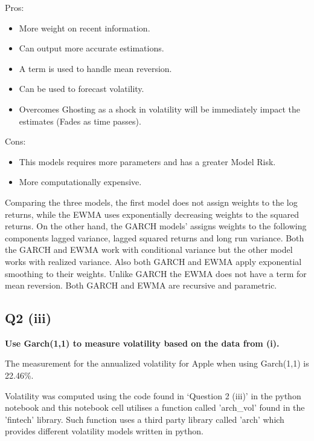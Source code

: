 Pros:
\begin{itemize}
  \item More weight on recent information.
  \item Can output more accurate estimations. 
  \item A term is used to handle mean reversion. 
  \item Can be used to forecast volatility. 
  \item Overcomes Ghosting as a shock in volatility will be immediately impact the estimates (Fades as time passes).
\end{itemize}

Cons:
\begin{itemize}
    \item This models requires more parameters and has a greater Model Risk.
    \item More computationally expensive. 
\end{itemize}

\noindent
Comparing the three models, the first model does not assign weights to the log returns, while the EWMA uses exponentially decreasing weights to the squared returns. On the other hand, the GARCH models’ assigns weights to the following components lagged variance, lagged squared returns and long run variance. Both the GARCH and EWMA work with conditional variance but the other model works with realized variance. Also both GARCH and EWMA apply exponential smoothing to their weights. Unlike GARCH the EWMA does not have a term for mean reversion. Both GARCH and EWMA are recursive and parametric. 




\subsection{Q2 (iii)}\label{sssec:pt2q2iii}
\textbf{Use Garch(1,1) to measure volatility based on the data from (i).}

\noindent
The measurement for the annualized volatility for Apple when using Garch(1,1) is 22.46\%. 

\noindent
Volatility was computed using the code found in ‘Question 2 (iii)’ in the python notebook and this notebook cell utilises a function called 'arch\_vol' found in the 'fintech' library. Such function uses a third party library called 'arch' \cite{python:arch} which provides different volatility models written in python. 

